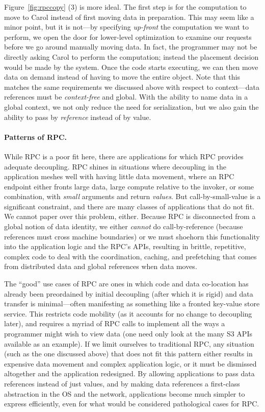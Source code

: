 Figure~\ref{fig:rpccopy} (3) is more ideal. The first step is for
the computation to move to Carol instead of first moving data in preparation.  This may seem like a
minor point, but it is not---by specifying \emph{up-front} the computation we want to perform, we
open the door for lower-level optimization to examine our requests before we go around manually
moving data.  In fact, the programmer may not be directly asking Carol to perform the
computation; instead the placement decision would be made by the system. Once the code starts
executing, we can then move data on demand instead of having to move the entire
object.
Note that this matches the same requirements we discussed above with respect to context---data references must
be \emph{context-free} and global. With the ability to name data in a global context, we not only reduce the need for
serialization, but we also gain the ability to pass by \emph{reference} instead of by value.


\paragraph*{Patterns of RPC.}
%
While RPC is a poor fit here, there are applications for which RPC provides adequate decoupling.
RPC shines in situations where decoupling in the application meshes well with having little data
movement, where an RPC endpoint either fronts large data, large compute relative to the invoker, or
some combination, with \emph{small} arguments and return \emph{values}.
But call-by-small-value is a significant constraint, and there are many
classes of applications that do not fit.
We cannot paper over this problem, either.
Because
RPC is disconnected from a global notion of data identity, we either \emph{cannot} do
call-by-reference (because references must cross machine boundaries) or we must shoehorn this
functionality into the application logic and the RPC's APIs, resulting in brittle, repetitive,
complex code to deal with the coordination, caching, and prefetching that
comes from distributed data and global references when data moves.

The ``good'' use cases of RPC are ones in which code and data
co-location has already been preordained by initial decoupling (after which it is rigid) and
data transfer is minimal---often manifesting as something like a fronted key-value store service. This restricts
code mobility (as it accounts for no change to decoupling later), and requires a myriad of RPC calls
to implement all the ways a programmer might wish to view data (one need only look at the many S3
APIs available as an example).
If we limit ourselves to traditional RPC, any situation (such as the one discussed
above) that does not fit this pattern either results in expensive data movement
and complex application logic, or it must be dismissed altogether and the application redesigned.
By allowing applications to pass data references instead of just values, and by making data
references a first-class abstraction in the OS and the network, applications become much simpler to
express efficiently, even for what would be considered pathological cases for RPC.

